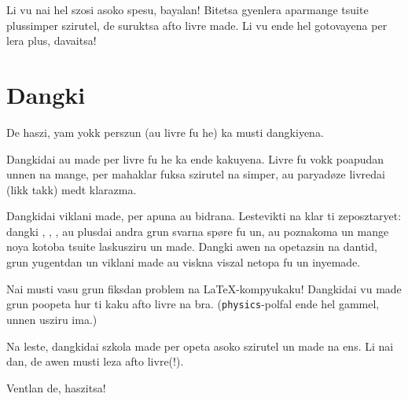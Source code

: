 Li vu nai hel szosi asoko spesu, bayalan! Bitetsa gyenlera aparmange tsuite
plussimper szirutel, de suruktsa afto livre made. Li vu ende hel gotovayena
per lera plus, davaitsa!


\section{Dangki}
De haszi, yam yokk perszun (au livre fu he) ka musti dangkiyena.

Dangkidai  au  made per livre fu he
ka ende kakuyena. Livre fu vokk poapudan unnen na mange, per mahaklar
fuksa szirutel na simper, au paryadøze livredai (likk takk) medt klarazma.

Dangkidai  viklani made, per apuna au bidrana. Lestevikti na
klar ti  zeposztaryet: dangki , ,
, au plusdai andra grun svarna spøre fu un, au poznakoma un
mange noya kotoba tsuite laskusziru un made. Dangki awen na  opetazsin na
dantid, grun yugentdan un viklani made au viskna viszal netopa fu un inyemade.

Nai musti vasu  grun fiksdan problem na \LaTeX-kompyukaku! Dangkidai
vu made grun poopeta hur ti kaku afto livre na bra. (\texttt{physics}-polfal ende
hel gammel, unnen usziru ima.)

Na leste, dangkidai szkola made per opeta asoko szirutel un made na ens. Li nai dan,
de awen musti leza afto livre(!).

\begin{center}
  Ventlan de, haszitsa!
\end{center}
